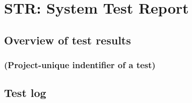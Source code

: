 \section{STR: System Test Report}

\subsection{Overview of test results}

\subsubsection{(Project-unique indentifier of a test)}

\subsection{Test log}
